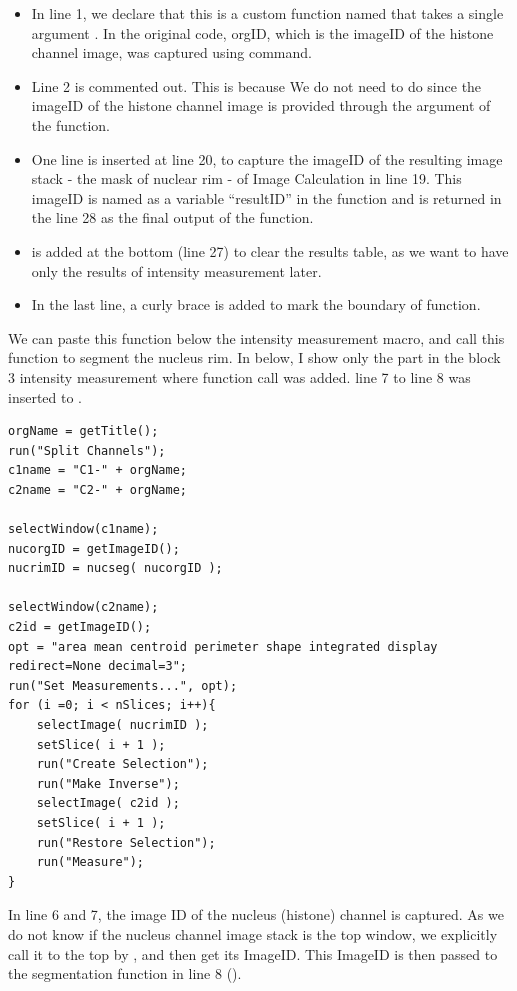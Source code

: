 \begin{itemize}
    \item In line 1, we declare that this is a custom function named  that takes a single argument . In the original code, orgID, which is the imageID of the histone channel image, was captured using  command. 
    \item Line 2 is commented out. This is because We do not need to do  since the imageID of the  histone channel image is provided through the argument of the function.  
    \item One line is inserted at line 20, to capture the imageID of the resulting image stack - the mask of nuclear rim - of Image Calculation in line 19. This imageID is named as a variable ``resultID'' in the function and is returned in the line 28 as the final output of the function.
    \item {} is added at the bottom (line 27) to clear the results table, as we want to have only the results of intensity measurement later.
    \item  In the last line, a curly brace is added to mark the boundary of function.
\end{itemize}

We can paste this function  below the intensity measurement macro, and call this function to segment the nucleus rim. In below, I show only the part in the block 3 intensity measurement where function call was added. line 7 to line 8 was inserted to . 

\begin{lstlisting}
orgName = getTitle();
run("Split Channels");
c1name = "C1-" + orgName;
c2name = "C2-" + orgName;

selectWindow(c1name);
nucorgID = getImageID();
nucrimID = nucseg( nucorgID );

selectWindow(c2name);
c2id = getImageID();
opt = "area mean centroid perimeter shape integrated display redirect=None decimal=3";
run("Set Measurements...", opt);
for (i =0; i < nSlices; i++){
    selectImage( nucrimID );
    setSlice( i + 1 );
    run("Create Selection");
    run("Make Inverse");
    selectImage( c2id );
    setSlice( i + 1 );
    run("Restore Selection");
    run("Measure");
}
\end{lstlisting}

In line 6 and 7, the image ID of the nucleus (histone) channel is captured. As we do not know if the nucleus channel image stack is the top window, we explicitly call it to the top by , and then get its ImageID. This ImageID  is then passed to the segmentation function in line 8 (). 

